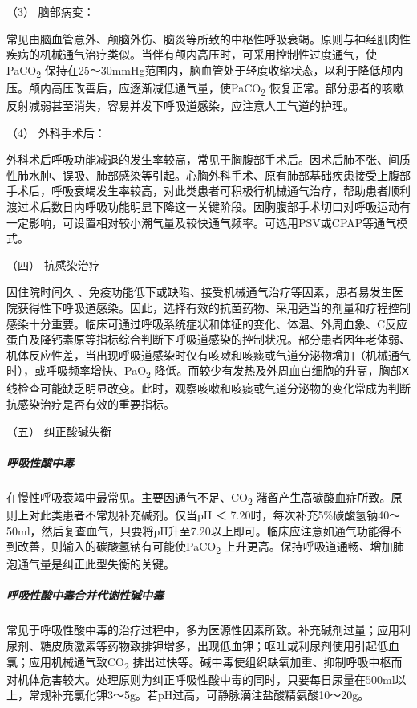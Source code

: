 \hypertarget{text00076.htmlux5cux23CHP3-4-3-2-3-4-3}{}
（3） 脑部病变：

常见由脑血管意外、颅脑外伤、脑炎等所致的中枢性呼吸衰竭。原则与神经肌肉性疾病的机械通气治疗类似。当伴有颅内高压时，可采用控制性过度通气，使PaCO\textsubscript{2}
保持在25～30mmHg范围内，脑血管处于轻度收缩状态，以利于降低颅内压。颅内高压改善后，应逐渐减低通气量，使PaCO\textsubscript{2}
恢复正常。部分患者的咳嗽反射减弱甚至消失，容易并发下呼吸道感染，应注意人工气道的护理。

\hypertarget{text00076.htmlux5cux23CHP3-4-3-2-3-4-4}{}
（4） 外科手术后：

外科术后呼吸功能减退的发生率较高，常见于胸腹部手术后。因术后肺不张、间质性肺水肿、误吸、肺部感染等引起。心胸外科手术、原有肺部基础疾患接受上腹部手术后，呼吸衰竭发生率较高，对此类患者可积极行机械通气治疗，帮助患者顺利渡过术后数日内呼吸功能明显下降这一关键阶段。因胸腹部手术切口对呼吸运动有一定影响，可设置相对较小潮气量及较快通气频率。可选用PSV或CPAP等通气模式。

\hypertarget{text00076.htmlux5cux23CHP3-4-3-2-4}{}
（四） 抗感染治疗

因住院时间久
、免疫功能低下或缺陷、接受机械通气治疗等因素，患者易发生医院获得性下呼吸道感染。因此，选择有效的抗菌药物、采用适当的剂量和疗程控制感染十分重要。临床可通过呼吸系统症状和体征的变化、体温、外周血象、C反应蛋白及降钙素原等指标综合判断下呼吸道感染的控制状况。部分患者因年老体弱、机体反应性差，当出现呼吸道感染时仅有咳嗽和咳痰或气道分泌物增加（机械通气时），或呼吸频率增快、PaO\textsubscript{2}
降低。而较少有发热及外周血白细胞的升高，胸部Ⅹ线检查可能缺乏明显改变。此时，观察咳嗽和咳痰或气道分泌物的变化常成为判断抗感染治疗是否有效的重要指标。

\hypertarget{text00076.htmlux5cux23CHP3-4-3-2-5}{}
（五） 纠正酸碱失衡

\subparagraph{呼吸性酸中毒}

在慢性呼吸衰竭中最常见。主要因通气不足、CO\textsubscript{2}
潴留产生高碳酸血症所致。原则上对此类患者不常规补充碱剂。仅当pH ＜
7.20时，每次补充5\%碳酸氢钠40～50ml，然后复查血气，只要将pH升至7.20以上即可。临床应注意如通气功能得不到改善，则输入的碳酸氢钠有可能使PaCO\textsubscript{2}
上升更高。保持呼吸道通畅、增加肺泡通气量是纠正此型失衡的关键。

\subparagraph{呼吸性酸中毒合并代谢性碱中毒}

常见于呼吸性酸中毒的治疗过程中，多为医源性因素所致。补充碱剂过量；应用利尿剂、糖皮质激素等药物致排钾增多，出现低血钾；呕吐或利尿剂使用引起低血氯；应用机械通气致CO\textsubscript{2}
排出过快等。碱中毒使组织缺氧加重、抑制呼吸中枢而对机体危害较大。处理原则为纠正呼吸性酸中毒的同时，只要每日尿量在500ml以上，常规补充氯化钾3～5g。若pH过高，可静脉滴注盐酸精氨酸10～20g。

